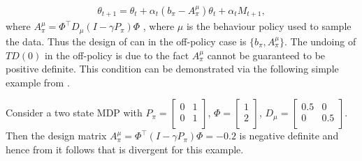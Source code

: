 \begin{align}\label{tdzerooffsa}
\theta_{t+1}=\theta_t+\alpha_t(b_\pi-A^\mu_\pi)\theta_t+\alpha_t M_{t+1},
\end{align}
where $A^{\mu}_\pi=\Phi^\top D_\mu (I-\gamma P_\pi)\Phi$ , where $\mu$ is the behaviour policy used to sample the data. Thus the design of \tdo can in the off-policy case is $\{b_\pi,A^\mu_\pi\}$.
The undoing of $TD(0)$ in the off-policy is due to the fact $A^\mu_\pi$ cannot be guaranteed to be positive definite. This condition can be demonstrated via the following simple example from \cite{}.
\begin{example}
Consider a two state MDP with $P_\pi=
\begin{bmatrix}
    0       & 1  \\
    0       & 1 \\
\end{bmatrix}$, $\Phi=\begin{bmatrix}
 1  \\
2 \\
\end{bmatrix}$, $D_\mu=
\begin{bmatrix}
    0.5       & 0  \\
    0       &0.5 \\
\end{bmatrix}$. Then the design matrix $A^\mu_\pi=\Phi^\top(I-\gamma P_\pi)\Phi=-0.2$ is negative definite and hence from  it follows that \tdo is divergent for this example.
\end{example}
%
